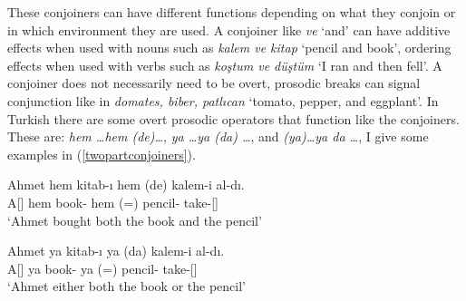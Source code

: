 These conjoiners can have different functions depending on what they conjoin or in which environment they are used. A conjoiner like \textit{ve} `and' can have additive effects when used with nouns such as \textit{kalem ve kitap} `pencil and book', ordering effects when used with verbs such as \textit{koştum ve düştüm} `I ran and then fell'. A conjoiner does not necessarily need to be overt, prosodic breaks can signal conjunction like in \textit{domates, biber, patlıcan} `tomato, pepper, and eggplant'. In Turkish there are some overt prosodic operators that function like the conjoiners. These are: \textit{hem \ldots hem (de)\ldots}, \textit{ya \ldots ya (da) \ldots}, and \textit{(ya)\ldots ya da \ldots}, I give some examples in (\ref{twopartconjoiners}).

\begin{exe}
    \ex \label{twopartconjoiners}
    \begin{xlist}
    \ex \gll Ahmet hem kitab-ı hem (de) kalem-i al-dı. \\ 
    A[{\Nom}] hem book-{\Acc} hem (={\Foc}) pencil-{\Acc} take-{\Pst}[{\Tsg}] \\
    \glt `Ahmet bought both the book and the pencil'
    
    \ex \gll Ahmet ya kitab-ı ya (da) kalem-i al-dı. \\ 
    A[{\Nom}] ya book-{\Acc} ya (={\Foc}) pencil-{\Acc} take-{\Pst}[{\Tsg}] \\
    \glt `Ahmet either both the book or the pencil'
    \end{xlist}
\end{exe}

 
 
 
 